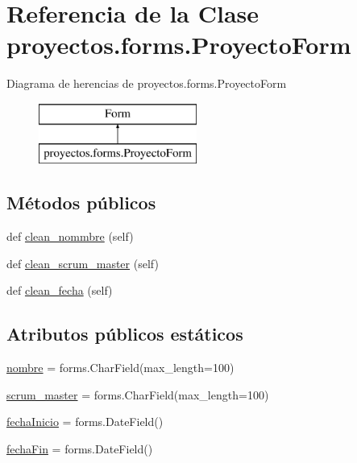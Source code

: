 \hypertarget{classproyectos_1_1forms_1_1_proyecto_form}{}\section{Referencia de la Clase proyectos.\+forms.\+Proyecto\+Form}
\label{classproyectos_1_1forms_1_1_proyecto_form}
Diagrama de herencias de proyectos.\+forms.\+Proyecto\+Form\begin{figure}[H]
\begin{center}
\leavevmode
\includegraphics[height=2.000000cm]{classproyectos_1_1forms_1_1_proyecto_form}
\end{center}
\end{figure}
\subsection*{Métodos públicos}
\begin{DoxyCompactItemize}
\item 
def \hyperlink{classproyectos_1_1forms_1_1_proyecto_form_a33bc0564dbd6bb6878c709408a3399e5}{clean\+\_\+nommbre} (self)
\item 
def \hyperlink{classproyectos_1_1forms_1_1_proyecto_form_a0691aba0125ea1e91e6e0e5516a55144}{clean\+\_\+scrum\+\_\+master} (self)
\item 
def \hyperlink{classproyectos_1_1forms_1_1_proyecto_form_a9fd0e481508a2d4c604b4c29f2515c6e}{clean\+\_\+fecha} (self)
\end{DoxyCompactItemize}
\subsection*{Atributos públicos estáticos}
\begin{DoxyCompactItemize}
\item 
\hyperlink{classproyectos_1_1forms_1_1_proyecto_form_a9f0c10ba92bde23f65580ea11e4f8a30}{nombre} = forms.\+Char\+Field(max\+\_\+length=100)
\item 
\hyperlink{classproyectos_1_1forms_1_1_proyecto_form_aa2dedba3703c69b6ac69f5373ab5a071}{scrum\+\_\+master} = forms.\+Char\+Field(max\+\_\+length=100)
\item 
\hyperlink{classproyectos_1_1forms_1_1_proyecto_form_adb7967b0733bfba0c98d006bd648251e}{fecha\+Inicio} = forms.\+Date\+Field()
\item 
\hyperlink{classproyectos_1_1forms_1_1_proyecto_form_a063a5638829e4f152e52253a5ecfd534}{fecha\+Fin} = forms.\+Date\+Field()
\end{DoxyCompactItemize}



